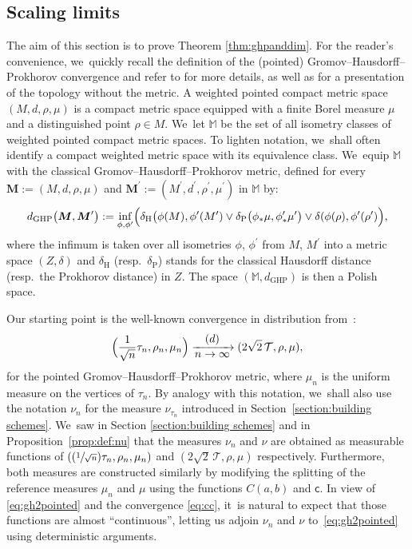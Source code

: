 \documentclass[JEP,XML,SOM,Unicode,NoFloatCountersInSection, NoEqCountersInSection,published]{cedram}
\newcommand{\Psfrac}[2]{(\sfrac{#1}{#2})}
\newcommand{\T}{\mathcal{T}}\let\CRT\T\let\tbr\T
\theoremstyle{definition}
\begin{document}
\subsection{Scaling limits}\label{sec:scalinglimitproof}
The aim of this section is to prove Theorem \ref{thm:ghpanddim}. For the reader's convenience, we~quickly recall the definition of the (pointed) Gromov--Hausdorff--Prokhorov convergence and refer to \cite{MR3035742,khezeli2020metrization} for more details, as well as \cite{AthreayLorWinter} for a presentation of the topology without the metric. A weighted pointed compact metric space $(M,d,\rho,\mu)$ is a compact metric space equipped with a finite Borel measure $\mu$ and a distinguished point $\rho\in M$. We~let $\mathbb{M}$ be the set of all isometry classes of weighted pointed compact metric spaces. To lighten notation, we~shall often identify a compact weighted metric space with its equivalence class. We~equip $\mathbb{M}$ with the classical Gromov--Hausdorff--Prokhorov metric, defined for every $\boldsymbol{M}:=(M,d, \rho,\mu)$ and $\boldsymbol{M}^{\prime}:=(M^{\prime},d^{{\prime}},\rho^\prime,\mu^{\prime})$ in $\mathbb{M}$ by:
\[
d_{\mathrm{GHP}}\big(\boldsymbol{M},\boldsymbol{M}^{\prime}\big):=\inf\limits_{\phi,\phi^{\prime}}\Bigl(\delta_{\text{H}}\big(\phi(M),\phi^{\prime}(M^{\prime})\vee \delta_{\text{P}}\big(\phi_* \mu,\phi^{\prime}_* \mu^{\prime}\big)\vee \delta(\phi(\rho),\phi^\prime(\rho^\prime)\Bigr),
\]
where the infimum is taken over all isometries $\phi$, $\phi^{\prime}$ from $M$, $M^{\prime}$ into a metric space $(Z, \delta)$ and $\delta_{\text{H}}$ (resp.~$\delta_{\text{P}}$) stands for the classical Hausdorff distance (resp.~the Prokhorov distance) in $Z$. The space $(\mathbb{M},d_{\mathrm{GHP}})$ is then a Polish space.

Our starting point is the well-known convergence in distribution from~\cite{Ald93}:
\begin{equation}\label{eq:gh2pointed} \Bigl(\frac{1}{\sqrt{n}}\tau_n,\rho_n,\mu_n \Bigr) \xrightarrow[\textstyle n\to\infty]{\textstyle(d)} (2\sqrt{2}\,\T,\rho,\mu),
\end{equation}
for the pointed Gromov--Hausdorff--Prokhorov metric, where $\mu_n$ is the uniform measure on the vertices of $\tau_n$. By analogy with this notation, we~shall also use the notation $\nu_n$ for the measure $\nu_{\tau_n}$ introduced in Section~\ref{section:building schemes}. We~saw in Section \ref{section:building schemes} and in Proposition~\ref{prop:def:nu} that the measures $\nu_n$ and $\nu$ are obtained as measurable functions of $(\Psfrac{1}{\sqrt{n}}\tau_n,\rho_n,\mu_n)$ and $(2\sqrt{2}\,\T,\rho,\mu)$ respectively. Furthermore, both measures are constructed similarly by modifying the splitting of the reference measures $\mu_n$ and $\mu$ using the functions $C(a,b)$ and $ \mathsf{c}$. In view of \eqref{eq:gh2pointed} and the convergence \eqref{eq:cc}, it~is natural to expect that those functions are almost ``continuous'', letting us adjoin $\nu_n$ and $\nu$ to~\eqref{eq:gh2pointed} using deterministic arguments.
\end{document}
